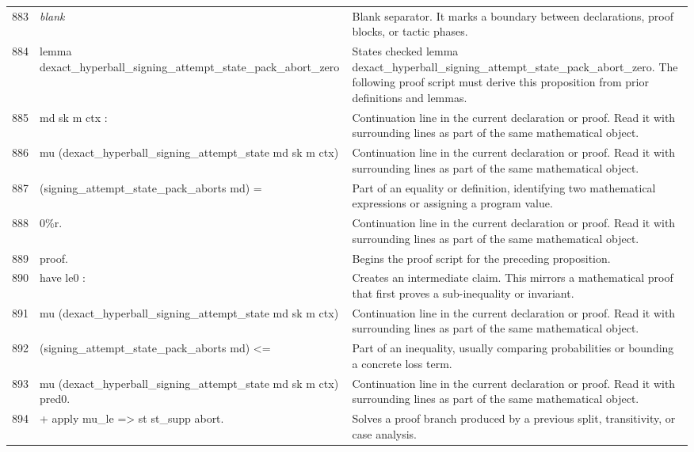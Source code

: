 \documentclass[10pt]{article}
\begin{document}
\begin{longtable}{r L{0.53\textwidth} L{0.37\textwidth}}
883 & {\ttfamily\scriptsize \emph{blank}} & Blank separator.  It marks a boundary between declarations, proof blocks, or tactic phases. \\
884 & {\ttfamily\scriptsize lemma dexact\_hyperball\_signing\_attempt\_state\_pack\_abort\_zero} & States checked lemma dexact\_hyperball\_signing\_attempt\_state\_pack\_abort\_zero.  The following proof script must derive this proposition from prior definitions and lemmas. \\
885 & {\ttfamily\scriptsize   md sk m ctx :} & Continuation line in the current declaration or proof.  Read it with surrounding lines as part of the same mathematical object. \\
886 & {\ttfamily\scriptsize   mu (dexact\_hyperball\_signing\_attempt\_state md sk m ctx)} & Continuation line in the current declaration or proof.  Read it with surrounding lines as part of the same mathematical object. \\
887 & {\ttfamily\scriptsize     (signing\_attempt\_state\_pack\_aborts md) =} & Part of an equality or definition, identifying two mathematical expressions or assigning a program value. \\
888 & {\ttfamily\scriptsize   0\%r.} & Continuation line in the current declaration or proof.  Read it with surrounding lines as part of the same mathematical object. \\
889 & {\ttfamily\scriptsize proof.} & Begins the proof script for the preceding proposition. \\
890 & {\ttfamily\scriptsize have le0 :} & Creates an intermediate claim.  This mirrors a mathematical proof that first proves a sub-inequality or invariant. \\
891 & {\ttfamily\scriptsize   mu (dexact\_hyperball\_signing\_attempt\_state md sk m ctx)} & Continuation line in the current declaration or proof.  Read it with surrounding lines as part of the same mathematical object. \\
892 & {\ttfamily\scriptsize     (signing\_attempt\_state\_pack\_aborts md) <=} & Part of an inequality, usually comparing probabilities or bounding a concrete loss term. \\
893 & {\ttfamily\scriptsize   mu (dexact\_hyperball\_signing\_attempt\_state md sk m ctx) pred0.} & Continuation line in the current declaration or proof.  Read it with surrounding lines as part of the same mathematical object. \\
894 & {\ttfamily\scriptsize + apply mu\_le => st st\_supp abort.} & Solves a proof branch produced by a previous split, transitivity, or case analysis. \\

\end{longtable}
\end{document}
